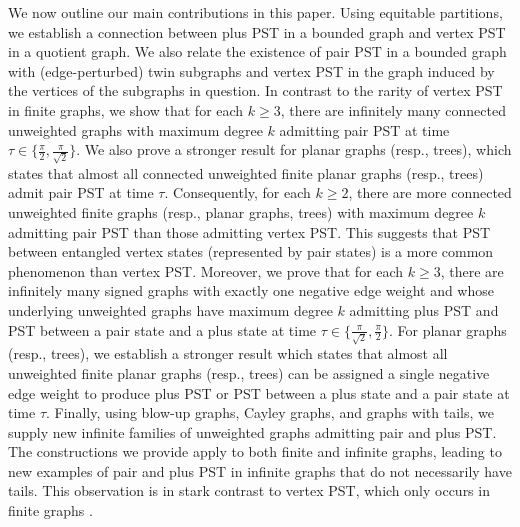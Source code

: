 \documentclass[12pt,a4paper]{article}
\begin{document}
We now outline our main contributions in this paper. Using equitable partitions, we establish a connection between plus PST in a bounded graph and vertex PST in a quotient graph. We also relate the existence of pair PST in a bounded graph with (edge-perturbed) twin subgraphs and vertex PST in the graph induced by the vertices of the subgraphs in question. In contrast to the rarity of vertex PST in finite graphs, we show that for each $k\geq 3$, there are infinitely many connected unweighted graphs with maximum degree $k$ admitting pair PST at time $\tau\in\{\frac{\pi}{2},\frac{\pi}{\sqrt{2}}\}$. We also prove a stronger result for planar graphs (resp., trees), which states that almost all connected unweighted finite planar graphs (resp., trees) admit pair PST at time $\tau$. Consequently, for each $k\geq 2$, there are more connected unweighted finite graphs (resp., planar graphs, trees) with maximum degree $k$ admitting pair PST than those admitting vertex PST. This suggests that PST between entangled vertex states (represented by pair states) is a more common phenomenon than vertex PST. Moreover, we prove that for each $k\geq 3$, there are infinitely many signed graphs with exactly one negative edge weight and whose underlying unweighted graphs have maximum degree $k$ admitting plus PST and PST between a pair state and a plus state at time $\tau\in\{\frac{\pi}{\sqrt{2}},\frac{\pi}{2}\}$. For planar graphs (resp., trees),  we establish a stronger result which states that almost all unweighted finite planar graphs (resp., trees) can be assigned a single negative edge weight to produce plus PST or PST between a plus state and a pair state at time $\tau$. Finally, using blow-up graphs, Cayley graphs, and graphs with tails, we supply new infinite families of unweighted graphs admitting pair and plus PST. The constructions we provide apply to both finite and infinite graphs, leading to new examples of pair and plus PST in infinite graphs that do not necessarily have tails. This observation is in stark contrast to vertex PST, which only occurs in finite graphs \cite{godd}. 

\end{document}
